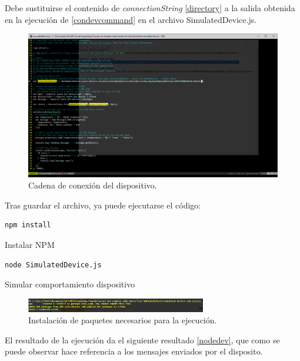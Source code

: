 \documentclass[english,runningheads,a4paper]{llncs}[2018/03/10]
\begin{document}
Debe sustituirse el contenido de \textit{connectionString}
\hyperref[directory]{\ref{directory}} a la salida obtenida en la ejecución de 
\hyperref[condevcommand]{\ref{condevcommand}} en el archivo SimulatedDevice.js.

\begin{figure}[h!]
 \centering
 \includegraphics[width=\textwidth]{./IoT/MicrosoftAzure/4-2_send_simulated_telemetry.png}
 \caption{Cadena de conexión del dispositivo.}
 \label{codestring}
\end{figure}

Tras guardar el archivo, ya puede ejecutarse el código:
\begin{listing}[htp]
\centering
    \begin{verbatim}
npm install
    \end{verbatim}
\caption{Instalar NPM}
\label{ejecdev1}
\end{listing}

\begin{listing}[htp]
\centering
    \begin{verbatim}
node SimulatedDevice.js
    \end{verbatim}
\caption{Simular comportamiento dispositivo}
\label{ejecdev2}
\end{listing}

\begin{figure}[h!]
 \centering
 \includegraphics[width=0.7\textwidth]{./IoT/MicrosoftAzure/4-4_send_simulated_telemetry.png}
 \caption{Instalación de paquetes necesarios para la ejecución.}
 \label{npmdev}
\end{figure}

El resultado de la ejecución da el siguiente resultado
\hyperref[nodedev]{\ref{nodedev}}, que como se puede observar hace referencia a 
los mensajes enviados por el disposito.
\end{document}
